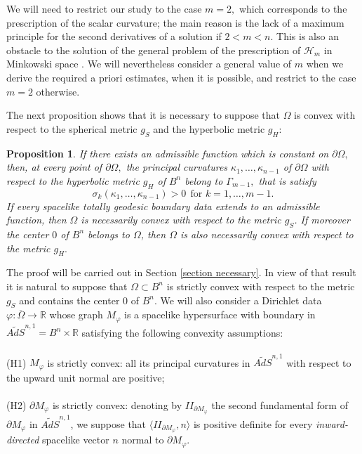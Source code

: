 \documentclass[10pt,reqno,oneside]{amsart}
\newtheorem{prop}[lem]{Proposition}
\theoremstyle{definition}
\theoremstyle{remark}
\newcommand{\R}{\mathbb{R}}
\begin{document}
We will need to restrict our study to the case $m=2,$ which corresponds to the prescription of the scalar curvature; the main reason is the lack of a maximum principle for the second derivatives of a solution if $2<m<n.$ This is also an obstacle to the solution of the general problem of the prescription of $\mathcal{H}_m$ in Minkowski space \cite{Bay1,Ur}. We will nevertheless consider a general value of $m$ when we derive the required a priori estimates, when it is possible, and restrict to the case $m=2$ otherwise.

The next proposition shows that it is necessary to suppose that $\Omega$ is convex with respect to the spherical metric $g_{S}$ and the hyperbolic metric $g_H:$
\begin{prop}\label{prop intro necessary cond}
If there exists an admissible function which is constant on $\partial\Omega,$ then, at every point of $\partial\Omega,$ the principal curvatures $\kappa_1,\ldots,\kappa_{n-1}$ of $\partial\Omega$ with respect to the hyperbolic metric $g_H$ of $B^n$ belong to $\Gamma_{m-1},$ that is satisfy
\begin{equation}\label{dp bord admissible}
\sigma_k(\kappa_1,\ldots,\kappa_{n-1})>0\ \ \mbox{for } k=1,\ldots,m-1.
\end{equation}
If every spacelike totally geodesic boundary data extends to an admissible function, then $\Omega$ is necessarily convex with respect to the metric $g_S$. If moreover the center $0$ of $B^n$ belongs to $\Omega$, then $\Omega$ is also necessarily convex with respect to the metric $g_H.$
\end{prop}
The proof will be carried out in Section \ref{section necessary}. In view of that result it is natural to suppose that $\Omega\subset B^n$ is strictly convex with respect to the metric $g_{S}$ and contains the center 0 of $B^n.$ We will also consider a Dirichlet data $\varphi:\overline{\Omega}\rightarrow\R$ whose graph $M_{\varphi}$ is a spacelike hypersurface with boundary in $\widetilde{AdS}^{n,1}=B^n\times\R$ satisfying the following convexity assumptions:
\\
\\(H1) $M_{\varphi}$ is strictly convex: all its principal curvatures in $\widetilde{AdS}^{n,1}$ with respect to the upward unit normal are positive;
\\
\\(H2) $\partial M_{\varphi}$ is strictly convex: denoting by $II_{\partial M_{\varphi}}$ the second fundamental form of $\partial M_{\varphi}$ in $\widetilde{AdS}^{n,1}$, we suppose that $\langle II_{\partial M_{\varphi}},n\rangle$ is positive definite for every \emph{inward-directed} spacelike vector $n$ normal to $\partial M_{\varphi}$. 
\\
\end{document}
